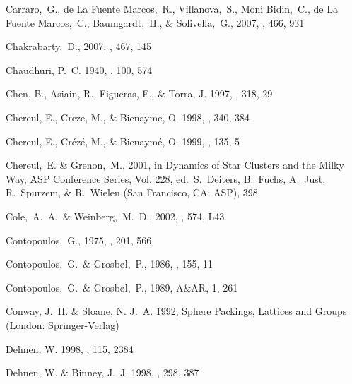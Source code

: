 \begin{thebibliography}{99}
  Carraro,~G., de La Fuente Marcos,~R., Villanova,~S., Moni Bidin,~C., de La Fuente Marcos,~C., Baumgardt,~H., \& Solivella,~G., 2007,
  \aap, 466, 931

  Chakrabarty,~D., 2007,
  \aap, 467, 145

{Chaudhuri}, P.~C. 1940, \mnras, 100, 574

{Chen}, B., {Asiain}, R., {Figueras}, F., \& {Torra}, J. 1997, \aap, 318, 29

{Chereul}, E., {Creze}, M., \& {Bienayme}, O. 1998, \aap, 340, 384

{Chereul}, E., {Cr{\'e}z{\'e}}, M., \& {Bienaym{\'e}}, O. 1999, \aaps, 135, 5

  Chereul,~E. \& Grenon,~M., 2001, in Dynamics of Star Clusters and the
  Milky Way, ASP Conference Series, Vol. 228, ed.~S.~Deiters, B.~Fuchs,
  A.~Just, R.~Spurzem, \& R.~Wielen (San Francisco, CA: ASP), 398

  Cole,~A.~A.~\& Weinberg,~M.~D., 2002,
  \apjl, 574, L43

  Contopoulos,~G., 1975,
  \apj, 201, 566

  Contopoulos,~G.~\& Grosb\o l,~P., 1986,
  \aap, 155, 11

  Contopoulos,~G.~\& Grosb\o l,~P., 1989,
  A\&AR, 1, 261

{Conway}, J.~H. \& {Sloane}, N. J.~A. 1992, {Sphere Packings, Lattices and
  Groups} (London: {Springer-Verlag})

{Dehnen}, W. 1998, \aj, 115, 2384

{Dehnen}, W. \& {Binney}, J.~J. 1998, \mnras, 298, 387


\end{thebibliography}
